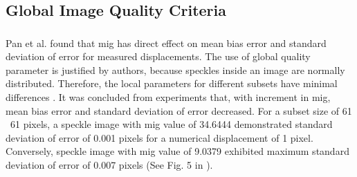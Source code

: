 

    \subsection{Global Image Quality Criteria}
    
    \subsubsection{}\label{subsubsection:mig}

        Pan et al. found that \gls{mig} has direct effect on mean bias error and standard deviation of error for measured displacements. The use of global quality parameter is justified by authors, because speckles inside an image are normally distributed. Therefore, the local parameters for different subsets have minimal differences \cite{pan_mig}. It was concluded from experiments that, with increment in \gls{mig}, mean bias error and standard deviation of error decreased. For a subset size of 61 \times\ 61 pixels, a speckle image with \gls{mig} value of 34.6444 demonstrated standard deviation of error of 0.001 pixels for a numerical displacement of 1 pixel. Conversely, speckle image with \gls{mig} value of 9.0379 exhibited maximum standard deviation of error of 0.007 pixels (See Fig. 5 in \cite{pan_mig}).   


    
